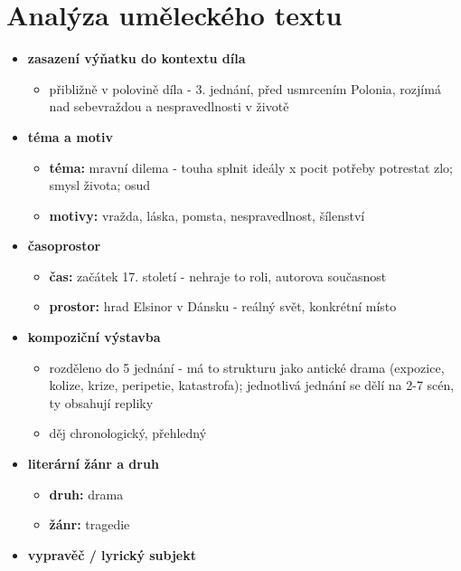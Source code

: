 \documentclass[11pt]{article}
\begin{document}
    \section*{Analýza uměleckého textu}
    \begin{itemize}
        \item\textbf{zasazení výňatku do kontextu díla}
        \begin{itemize}
            \item přibližně v polovině díla - 3. jednání, před usmrcením Polonia, rozjímá nad sebevraždou a nespravedlnosti v životě
        \end{itemize}
        \item\textbf{téma a motiv}
        \begin{itemize}
            \item\textbf{téma: }mravní dilema - touha splnit ideály x pocit potřeby potrestat zlo; smysl života; osud
            \item\textbf{motivy: }vražda, láska, pomsta, nespravedlnost, šílenství
        \end{itemize}
        \item\textbf{časoprostor}
        \begin{itemize}
            \item\textbf{čas: }začátek 17. století - nehraje to roli, autorova současnost
            \item\textbf{prostor: }hrad Elsinor v Dánsku - reálný svět, konkrétní místo
        \end{itemize}
        \item\textbf{kompoziční výstavba}
        \begin{itemize}
            \item rozděleno do 5 jednání - má to strukturu jako antické drama (expozice, kolize, krize, peripetie, katastrofa); jednotlivá jednání se dělí na 2-7 scén, ty obsahují repliky
            \item děj chronologický, přehledný
        \end{itemize}
        \item\textbf{literární žánr a druh}
        \begin{itemize}
            \item\textbf{druh: }drama
            \item\textbf{žánr: }tragedie
        \end{itemize}
        \item\textbf{vypravěč / lyrický subjekt}
        \begin{itemize}

\end{itemize}
\end{itemize}
\end{document}
